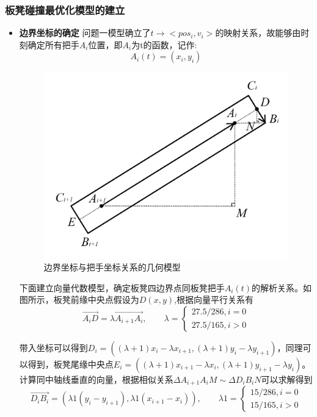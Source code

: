 \documentclass[a4paper]{article}
\begin{document}
        \subsubsection{板凳碰撞最优化模型的建立}
    \begin{itemize}
        \item {\textbf{边界坐标的确定}}
        问题一模型确立了$t\to<pos_i,v_i>$的映射关系，故能够由时刻确定所有把手$A_{i}$位置，即$A_{i}$为t的函数，记作:$$A_{i}(t) = (x_i, y_i)$$
        \begin{figure}[H]
            \centering
            \includegraphics[width=0.5\linewidth]{image/Figure_5213.png}
            \caption{边界坐标与把手坐标关系的几何模型}
            \label{fig:enter-label1}
        \end{figure}

        下面建立向量代数模型，确定板凳四边界点同板凳把手$A_i(t)$的解析关系。如图所示，板凳前缘中央点假设为$D(x,y)$,根据向量平行关系有
        $$
                   \overrightarrow{A_iD} = \lambda\overrightarrow{A_{i+1}A_i}
        ,\quad\quad \lambda = \left\{ \begin{array}{c}
              27.5 / 286, i = 0 \\
              27.5 / 165, i > 0

        \end{array}\right.
        $$

        带入坐标可以得到$D_i = ((\lambda + 1) x_{i} - \lambda x_{i + 1}, (\lambda + 1) y_{i} - \lambda y_{i + 1})$，同理可以得到，板凳尾缘中央点$E_i = ((\lambda + 1) x_{i + 1} - \lambda x_{i}, (\lambda + 1) y_{i + 1} - \lambda y_{i})$。
        计算同中轴线垂直的向量，根据相似关系$\Delta A_{i+ 1}A_iM \sim \Delta D_iB_iN$可以求解得到
        $$\overrightarrow{D_i B_i} = (\lambda 1 (y_i - y_{i + 1}), \lambda 1 (x_{i + 1} - x_i)),
        \quad \quad \lambda 1 = \left\{ \begin{array}{c}
             15/286, i = 0  \\
             15/165, i > 0
        \end{array}
        \right.$$


\end{itemize}
\end{document}
